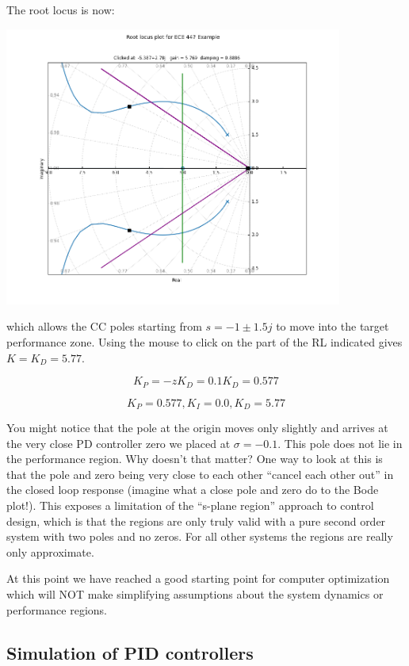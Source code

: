 \begin{ExampleCont}
The root locus is now:

\includegraphics[width=111mm]{figs09/R15J20.png}

which allows the CC poles starting from $s=-1\pm1.5j$ to move into the
target performance zone.   Using the mouse to
click on the part of the RL indicated gives $K = K_D = 5.77$.

 \[
 K_P = -zK_D = 0.1K_D = 0.577
 \]

\[
K_P = 0.577, K_I = 0.0,  K_D = 5.77
\]

You might notice that the pole at the origin moves only slightly and
arrives at the very close
PD controller zero we placed at $\sigma=-0.1$.  This pole does not lie in the performance region.
Why doesn't that matter?
One way to look at this is that the pole and zero being very close to each other
``cancel each other out'' in the closed loop response
(imagine what a close pole and zero do to the Bode plot!).
This exposes a limitation of the ``s-plane region'' approach to control
design, which is that the regions are only truly valid with a pure second order system
with two poles and no zeros.  For all other systems the regions are really only approximate.

At this point we have reached a good starting point for computer optimization which
will NOT make simplifying assumptions about the system dynamics or performance regions.
\end{ExampleCont}



\subsection{Simulation of PID controllers}\label{simulationPIDcontrollers}

